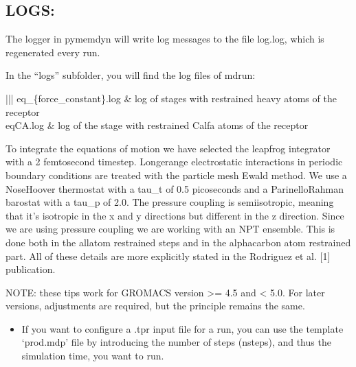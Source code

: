\documentclass[letterpaper,10pt,english]{sphinxmanual}
\begin{document}
\subsection{LOGS:}
\label{\detokenize{manual:logs}}
\sphinxAtStartPar
The logger in pymemdyn will write log messages to the file log.log, which
is regenerated every run.

\begin{DUlineblock}{0em}
\item[] In the “logs” subfolder, you will find the log files of mdrun:
\end{DUlineblock}


\begin{savenotes}\sphinxattablestart
\sphinxthistablewithglobalstyle
\centering
\begin{tabular}[t]{|||}
\sphinxtoprule
\sphinxtableatstartofbodyhook
\sphinxAtStartPar
eq\_\{force\_constant\}.log
&
\sphinxAtStartPar
log of stages with restrained heavy atoms of the receptor
\\
\sphinxhline
\sphinxAtStartPar
eqCA.log
&
\sphinxAtStartPar
log of the stage with restrained C\sphinxhyphen{}alfa atoms of the receptor
\\
\sphinxbottomrule
\end{tabular}
\sphinxtableafterendhook\par
\sphinxattableend\end{savenotes}

\sphinxAtStartPar
{} To integrate the equations of motion we have
selected the leap\sphinxhyphen{}frog integrator with a 2 femtosecond timestep.
Longe\sphinxhyphen{}range electrostatic interactions in periodic boundary conditions
are treated with the particle mesh Ewald method. We use a Nose\sphinxhyphen{}Hoover
thermostat with a tau\_t of 0.5 picoseconds and a Parinello\sphinxhyphen{}Rahman
barostat with a tau\_p of 2.0. The pressure coupling is semiisotropic,
meaning that it’s isotropic in the x and y directions but different in
the z direction. Since we are using pressure coupling we are working
with an NPT ensemble. This is done both in the all\sphinxhyphen{}atom restrained steps
and in the alpha\sphinxhyphen{}carbon atom restrained part. All of these details are
more explicitly stated in the Rodriguez et al. {[}1{]} publication.

\sphinxAtStartPar
{}

\sphinxAtStartPar
NOTE: these tips work for GROMACS version \textgreater{}= 4.5 and \textless{} 5.0. For later
versions, adjustments are required, but the principle remains the same.
\begin{itemize}
\item {} 
\sphinxAtStartPar
If you want to configure a .tpr input file for a  run,
you can use the template ‘prod.mdp’ file by introducing the number of
steps (nsteps), and thus the simulation time, you want to run.

\end{itemize}
\end{document}
